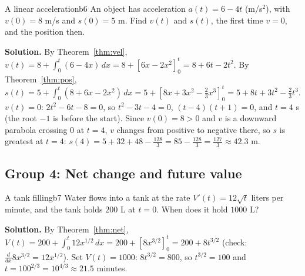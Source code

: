 \documentclass[11pt]{article}
\begin{document}
\begin{exmp}{A linear acceleration}{b6}
An object has acceleration $a(t)=6-4t$ (m/s$^2$), with $v(0)=8$ m/s and $s(0)=5$ m. Find $v(t)$ and $s(t)$, the first time $v=0$, and the position then.

\textbf{Solution.} By Theorem~\ref{thm:vel}, $v(t)=8+\int_0^t(6-4x)\,dx=8+\left[6x-2x^2\right]_0^t=8+6t-2t^2$. By Theorem~\ref{thm:pos}, $s(t)=5+\int_0^t(8+6x-2x^2)\,dx=5+\left[8x+3x^2-\frac23x^3\right]_0^t=5+8t+3t^2-\frac23t^3$.
$v(t)=0$: $2t^2-6t-8=0$, so $t^2-3t-4=0$, $(t-4)(t+1)=0$, and $t=4$ s (the root $-1$ is before the start). Since $v(0)=8>0$ and $v$ is a downward parabola crossing $0$ at $t=4$, $v$ changes from positive to negative there, so $s$ is greatest at $t=4$: $s(4)=5+32+48-\frac{128}3=85-\frac{128}3=\frac{127}3\approx42.3$ m.
\end{exmp}

\subsection*{Group 4: Net change and future value}

\begin{exmp}{A tank filling}{b7}
Water flows into a tank at the rate $V'(t)=12\sqrt t$ liters per minute, and the tank holds $200$ L at $t=0$. When does it hold $1000$ L?

\textbf{Solution.} By Theorem~\ref{thm:net}, $V(t)=200+\int_0^t12x^{1/2}\,dx=200+\left[8x^{3/2}\right]_0^t=200+8t^{3/2}$ (check: $\frac{d}{dx}8x^{3/2}=12x^{1/2}$). Set $V(t)=1000$: $8t^{3/2}=800$, so $t^{3/2}=100$ and $t=100^{2/3}=10^{4/3}\approx21.5$ minutes.
\end{exmp}
\end{document}
